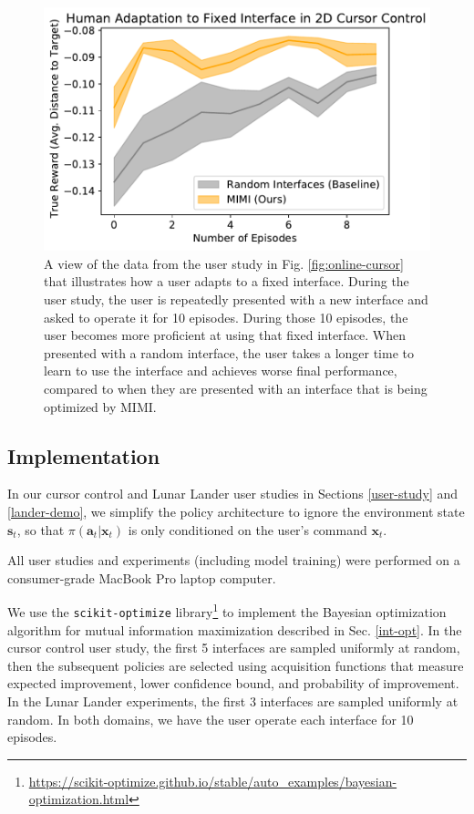 \documentclass{article}
\newcommand{\bx}{\mathbf{x}}
\newcommand{\bs}{\mathbf{s}}
\newcommand{\ba}{\mathbf{a}}
\begin{document}
\begin{figure}[t]
    \centering
    \includegraphics[width=0.5\linewidth]{human-adaptation.pdf}
    \caption{A view of the data from the user study in Fig. \ref{fig:online-cursor} that illustrates how a user adapts to a fixed interface. During the user study, the user is repeatedly presented with a new interface and asked to operate it for 10 episodes. During those 10 episodes, the user becomes more proficient at using that fixed interface. When presented with a random interface, the user takes a longer time to learn to use the interface and achieves worse final performance, compared to when they are presented with an interface that is being optimized by MIMI.}
    \label{fig:human-adaptation}
\end{figure}

\subsection{Implementation} \label{imp-details}

In our cursor control and Lunar Lander user studies in Sections \ref{user-study} and \ref{lander-demo}, we simplify the policy architecture to ignore the environment state $\bs_t$, so that $\pi(\ba_t | \bx_t)$ is only conditioned on the user's command $\bx_t$.

All user studies and experiments (including model training) were performed on a consumer-grade MacBook Pro laptop computer.

We use the \verb+scikit-optimize+ library\footnote{\url{https://scikit-optimize.github.io/stable/auto_examples/bayesian-optimization.html}} to implement the Bayesian optimization algorithm for mutual information maximization described in Sec. \ref{int-opt}.
In the cursor control user study, the first 5 interfaces are sampled uniformly at random, then the subsequent policies are selected using acquisition functions that measure expected improvement, lower confidence bound, and probability of improvement.
In the Lunar Lander experiments, the first 3 interfaces are sampled uniformly at random.
In both domains, we have the user operate each interface for 10 episodes.
\end{document}
